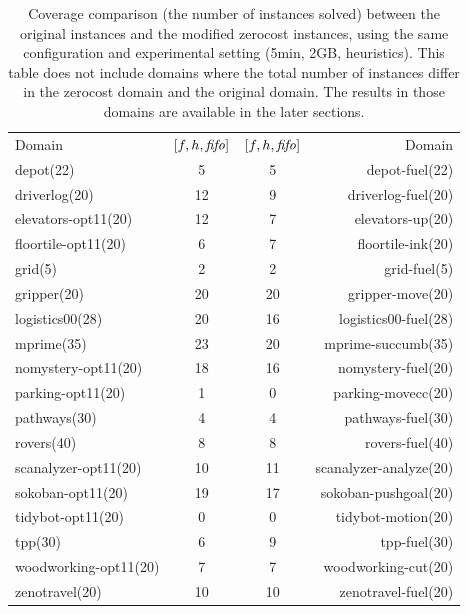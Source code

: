 \begin{table}[htbp]
 \centering
\begin{tabular}{|lc|cr|}
Domain & \([f,h,{\text{\textit{fifo}}}]\) & \([f,h,{\text{\textit{fifo}}}]\) & Domain\\
depot(22) & 5 & 5 & depot-fuel(22)\\
driverlog(20) & 12 & 9 & driverlog-fuel(20)\\
elevators-opt11(20) & 12 & 7 & elevators-up(20)\\
floortile-opt11(20) & 6 & 7 & floortile-ink(20)\\
grid(5) & 2 & 2 & grid-fuel(5)\\
gripper(20) & 20 & 20 & gripper-move(20)\\
logistics00(28) & 20 & 16 & logistics00-fuel(28)\\
mprime(35) & 23 & 20 & mprime-succumb(35)\\
nomystery-opt11(20) & 18 & 16 & nomystery-fuel(20)\\
parking-opt11(20) & 1 & 0 & parking-movecc(20)\\
pathways(30) & 4 & 4 & pathways-fuel(30)\\
rovers(40) & 8 & 8 & rovers-fuel(40)\\
scanalyzer-opt11(20) & 10 & 11 & scanalyzer-analyze(20)\\
sokoban-opt11(20) & 19 & 17 & sokoban-pushgoal(20)\\
tidybot-opt11(20) & 0 & 0 & tidybot-motion(20)\\
tpp(30) & 6 & 9 & tpp-fuel(30)\\
woodworking-opt11(20) & 7 & 7 & woodworking-cut(20)\\
zenotravel(20) & 10 & 10 & zenotravel-fuel(20)\\
\end{tabular}
 \caption{
 Coverage comparison (the number of instances solved) 
 between the original instances and the modified zerocost instances,
 using the same configuration and experimental setting (5min, 2GB, \mands heuristics).
 This table does not include domains where the total number of instances
 differ in the zerocost domain and the original domain. The results in
 those domains are available in the later sections.
 }
 \label{tbl:mands-zerocost-std}
\end{table}

